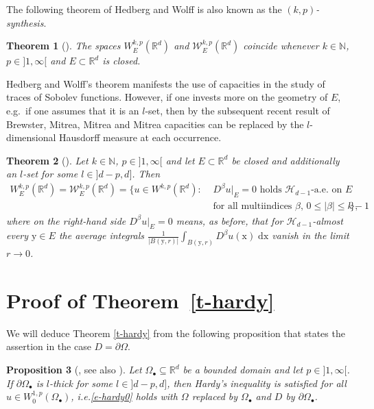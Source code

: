 \documentclass[10pt,leqno]{amsart}
\newtheorem{theorem}{Theorem}[section]
\newtheorem{proposition}[theorem]{Proposition}
\theoremstyle{definition}
\numberwithin{equation}{section}
\begin{document}
The following theorem of Hedberg and Wolff is also known as the
\emph{$(k,p)$-synthesis}.

\begin{theorem}[{\cite[Thm.\ 9.1.3]{ad/he}}] \label{t-coincid}
The spaces $W_E^{k,p}({{\mathbb R}}^d)$ and ${{{{\mathcal{W}}}}}_E^{k,p}({{\mathbb R}}^d)$ coincide whenever $k \in
{{\mathbb N}}$, $p \in {]1,\infty[}$ and $E \subset {{\mathbb R}}^d$ is closed.
\end{theorem}

Hedberg and Wolff's theorem manifests the use of capacities in the study of
traces of Sobolev functions. However, if one invests more on the
geometry of $E$, e.g.\ if one assumes that it is an $l$-set, then by the
subsequent recent result of Brewster, Mitrea, Mitrea and Mitrea capacities can
be replaced by the $l$-dimensional Hausdorff measure at each occurrence.

\begin{theorem}[{\cite[Thm.\ 4.4, Cor.\ 4.5]{mitrea}}]
\label{t-coincid-mitrea}
Let $k \in {{\mathbb N}}$, $p \in {]1,\infty[}$ and let $E \subset {{\mathbb R}}^d$ be closed and
additionally an $l$-set for some $l \in {]d-p,d]}$. Then
\begin{align*}
 W_E^{k,p}({{\mathbb R}}^d) = {{{{\mathcal{W}}}}}_E^{k,p}({{\mathbb R}}^d)= \big\{u \in W^{k,p}({{\mathbb R}}^d): &\text{
 $D^\beta u|_E = 0$ holds ${\mathcal{H}_{d-1}}$-a.e.\ on $E$} \\ &\text{ for all multiindices
 $\beta$, $0\leq |\beta| \leq k-1$} \big\},
\end{align*}
where on the right-hand side $D^\beta u|_E = 0$ means, as before, that for
${\mathcal{H}_{d-1}}$-almost every ${{\mathrm y}} \in E$ the average integrals
$\frac{1}{|B({{\mathrm y}},r)|}\int_{B({{\mathrm y}},r)} D^\beta u({{\mathrm x}})  \; {{\mathrm d}} {{\mathrm x}} $ vanish in the limit
$r \to 0$.
\end{theorem}

\section{Proof of Theorem~\ref{t-hardy}} \label{sec-proof} We will deduce
Theorem \ref{t-hardy} from the following proposition that states
the assertion in the case $D = \partial \Omega$. 

\begin{proposition}[\cite{juha}, see also \cite{korte}] \label{p-juha}
 Let $\Omega_\bullet \subseteq {{\mathbb R}}^d$ be a bounded domain and let $p \in
{]1,\infty[}$. If $\partial \Omega_\bullet$ is $l$-thick for some $l \in
{]d-p,d]}$, then Hardy's inequality is satisfied for all $u
\in W^{1,p}_0(\Omega_\bullet)$, i.e.\@ \eqref{e-hardy0} holds with $\Omega$
replaced by $\Omega_\bullet$ and $D$ by $\partial \Omega_\bullet$.
\end{proposition}
\end{document}
